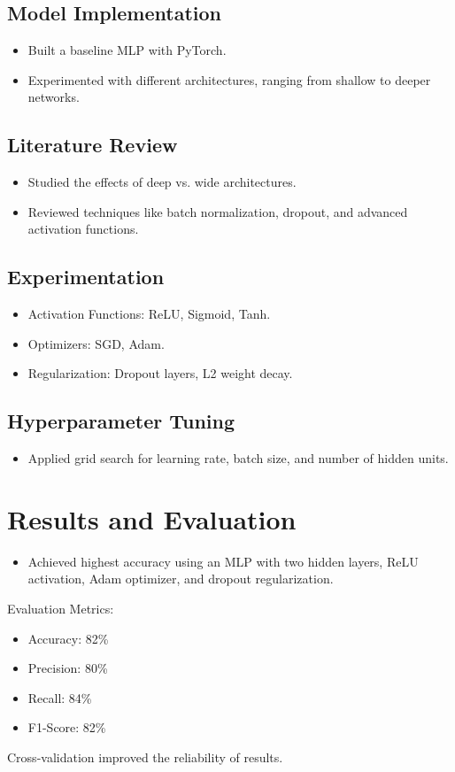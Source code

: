 \documentclass[12pt]{article}
\begin{document}
\subsection{Model Implementation}
\begin{itemize}
    \item Built a baseline MLP with PyTorch.
    \item Experimented with different architectures, ranging from shallow to deeper networks.
\end{itemize}

\subsection{Literature Review}
\begin{itemize}
    \item Studied the effects of deep vs. wide architectures.
    \item Reviewed techniques like batch normalization, dropout, and advanced activation functions.
\end{itemize}

\subsection{Experimentation}
\begin{itemize}
    \item Activation Functions: ReLU, Sigmoid, Tanh.
    \item Optimizers: SGD, Adam.
    \item Regularization: Dropout layers, L2 weight decay.
\end{itemize}

\subsection{Hyperparameter Tuning}
\begin{itemize}
    \item Applied grid search for learning rate, batch size, and number of hidden units.
\end{itemize}

\section{Results and Evaluation}
\begin{itemize}
    \item Achieved highest accuracy using an MLP with two hidden layers, ReLU activation, Adam optimizer, and dropout regularization.
\end{itemize}
Evaluation Metrics:
\begin{itemize}
    \item Accuracy: 82\%
    \item Precision: 80\%
    \item Recall: 84\%
    \item F1-Score: 82\%
\end{itemize}
Cross-validation improved the reliability of results.
\end{document}
